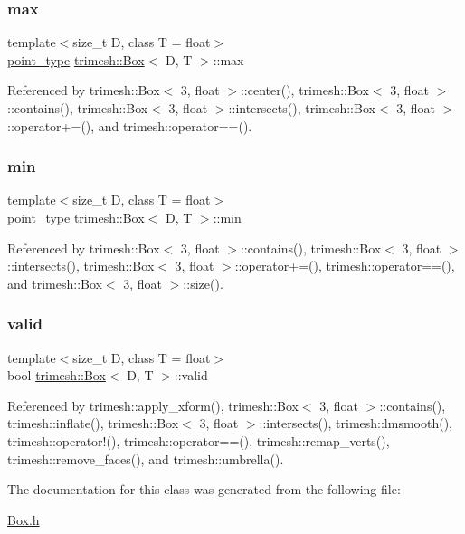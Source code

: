 \subsubsection{\texorpdfstring{max}{max}}
{\footnotesize\ttfamily template$<$size\+\_\+t D, class T = float$>$ \\
\hyperlink{classtrimesh_1_1Box_a208c806781f96a7001491a275dfa7655}{point\+\_\+type} \hyperlink{classtrimesh_1_1Box}{trimesh\+::\+Box}$<$ D, T $>$\+::max}



Referenced by trimesh\+::\+Box$<$ 3, float $>$\+::center(), trimesh\+::\+Box$<$ 3, float $>$\+::contains(), trimesh\+::\+Box$<$ 3, float $>$\+::intersects(), trimesh\+::\+Box$<$ 3, float $>$\+::operator+=(), and trimesh\+::operator==().

\mbox{\label{classtrimesh_1_1Box_a58c2da25c281e02ddc987c157e666517}} 
\subsubsection{\texorpdfstring{min}{min}}
{\footnotesize\ttfamily template$<$size\+\_\+t D, class T = float$>$ \\
\hyperlink{classtrimesh_1_1Box_a208c806781f96a7001491a275dfa7655}{point\+\_\+type} \hyperlink{classtrimesh_1_1Box}{trimesh\+::\+Box}$<$ D, T $>$\+::min}



Referenced by trimesh\+::\+Box$<$ 3, float $>$\+::contains(), trimesh\+::\+Box$<$ 3, float $>$\+::intersects(), trimesh\+::\+Box$<$ 3, float $>$\+::operator+=(), trimesh\+::operator==(), and trimesh\+::\+Box$<$ 3, float $>$\+::size().

\mbox{\label{classtrimesh_1_1Box_a388cbaca80a84b13ed434835a470b70c}} 
\subsubsection{\texorpdfstring{valid}{valid}}
{\footnotesize\ttfamily template$<$size\+\_\+t D, class T = float$>$ \\
bool \hyperlink{classtrimesh_1_1Box}{trimesh\+::\+Box}$<$ D, T $>$\+::valid}



Referenced by trimesh\+::apply\+\_\+xform(), trimesh\+::\+Box$<$ 3, float $>$\+::contains(), trimesh\+::inflate(), trimesh\+::\+Box$<$ 3, float $>$\+::intersects(), trimesh\+::lmsmooth(), trimesh\+::operator!(), trimesh\+::operator==(), trimesh\+::remap\+\_\+verts(), trimesh\+::remove\+\_\+faces(), and trimesh\+::umbrella().



The documentation for this class was generated from the following file\+:\begin{DoxyCompactItemize}
\item 
\hyperlink{Box_8h}{Box.\+h}\end{DoxyCompactItemize}
